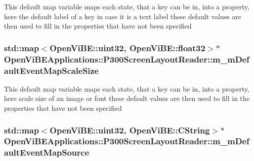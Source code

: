 This default map variable maps each state, that a key can be in, into a property, here the default label of a key in case it is a text label these default values are then used to fill in the properties that have not been specified \hypertarget{classOpenViBEApplications_1_1P300ScreenLayoutReader_a35ca3829364243d83c0768f53be3b725}{
\subsubsection[{m\_\-mDefaultEventMapScaleSize}]{\setlength{\rightskip}{0pt plus 5cm}std::map$<$OpenViBE::uint32, OpenViBE::float32$>$$\ast$ {\bf OpenViBEApplications::P300ScreenLayoutReader::m\_\-mDefaultEventMapScaleSize}}}
\label{classOpenViBEApplications_1_1P300ScreenLayoutReader_a35ca3829364243d83c0768f53be3b725}
This default map variable maps each state, that a key can be in, into a property, here scale size of an image or font these default values are then used to fill in the properties that have not been specified \hypertarget{classOpenViBEApplications_1_1P300ScreenLayoutReader_a7b20c682793b9f3608a01dde6d7ce53c}{
\subsubsection[{m\_\-mDefaultEventMapSource}]{\setlength{\rightskip}{0pt plus 5cm}std::map$<$OpenViBE::uint32, OpenViBE::CString$>$$\ast$ {\bf OpenViBEApplications::P300ScreenLayoutReader::m\_\-mDefaultEventMapSource}}}
\label{classOpenViBEApplications_1_1P300ScreenLayoutReader_a7b20c682793b9f3608a01dde6d7ce53c}
